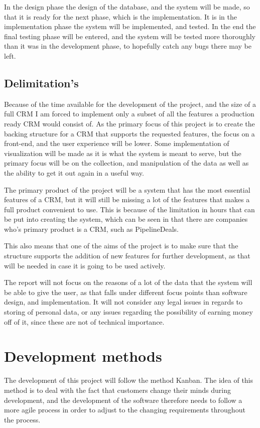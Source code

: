 In the design phase the design of the database, and the system will be made, so
that it is ready for the next phase, which is the implementation. It is in the
implementation phase the system will be implemented, and tested. In the end the
final testing phase will be entered, and the system will be tested more
thoroughly than it was in the development phase, to hopefully catch any bugs
there may be left. 

\subsection{Delimitation's}
\label{sub:Delimitations}
Because of the time available for the development of the project, and the size
of a full CRM I am forced to implement only a subset of all the features a
production ready CRM would consist of. As the primary focus of this project is
to create the backing structure for a CRM that supports the requested features,
the focus on a front-end, and the user experience will be lower. Some
implementation of visualization will be made as it is what the system is meant
to serve, but the primary focus will be on the collection, and manipulation of
the data as well as the ability to get it out again in a useful way. 

The primary product of the project will be a system that has the most essential
features of a CRM, but it will still be missing a lot of the features that makes
a full product convenient to use. This is because of the limitation in hours
that can be put into creating the system, which can be seen in that there are
companies who's primary product is a CRM, such as PipelineDeals. 

This also means that one of the aims of the project is to make sure that the
structure supports the addition of new features for further development, as that
will be needed in case it is going to be used actively. 

The report will not focus on the reasons of a lot of the data that the system
will be able to give the user, as that falls under different focus points than
software design, and implementation. It will not consider any legal issues in
regards to storing of personal data, or any issues regarding the possibility of
earning money off of it, since these are not of technical importance. 

\section{Development methods}
\label{sec:Development methods}
The development of this project will follow the method Kanban. The idea of this
method is to deal with the fact that customers change their minds during
development, and the development of the software therefore needs to follow a
more agile process in order to adjust to the changing requirements throughout
the process. 

